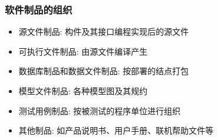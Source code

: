 \documentclass[compress]{beamer}
\begin{document}
\begin{frame}
  \frametitle{软件制品的组织}

  \begin{itemize}
    \item 源文件制品: 构件及其接口编程实现后的源文件 
    \item 可执行文件制品: 由源文件编译产生 
    \item 数据库制品和数据文件制品: 按部署的结点打包
    \item 模型文件制品: 各种模型图及其规约
    \item 测试用例制品: 按被测试的程序单位进行组织 
    \item 其他制品: 如产品说明书、用户手册、联机帮助文件等
  \end{itemize}

\end{frame}
\end{document}
